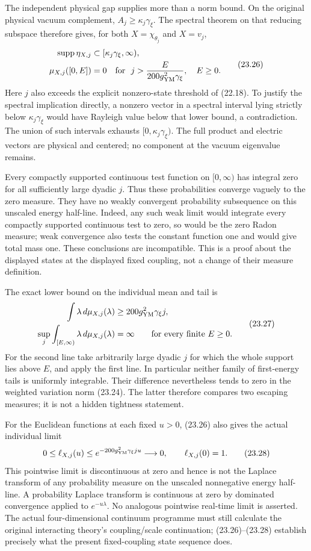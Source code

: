 \documentclass[
]{article}
\begin{document}
The independent physical gap supplies more than a norm bound. On the
original physical vacuum complement, \(A_j\ge\kappa_j\gamma_\xi\). The
spectral theorem on that reducing subspace therefore gives, for both
\(X=\chi_{\theta_j}\) and \(X=v_j\), \[
\begin{aligned}
\operatorname{supp}\eta_{X,j}
 &\subset[\kappa_j\gamma_\xi,\infty),\\
\mu_{X,j}([0,E])&=0
\quad\hbox{for }\ 
j>\frac{E}{200g_{\rm YM}^2\gamma_\xi},\quad E\ge0 .
\end{aligned}\tag{23.26}
\] Here \(j\) also exceeds the explicit nonzero-state threshold of
(22.18). To justify the spectral implication directly, a nonzero vector
in a spectral interval lying strictly below \(\kappa_j\gamma_\xi\) would
have Rayleigh value below that lower bound, a contradiction. The union
of such intervals exhausts \([0,\kappa_j\gamma_\xi)\). The full product
and electric vectors are physical and centered; no component at the
vacuum eigenvalue remains.

Every compactly supported continuous test function on \([0,\infty)\) has
integral zero for all sufficiently large dyadic \(j\). Thus these
probabilities converge vaguely to the zero measure. They have no weakly
convergent probability subsequence on this unscaled energy half-line.
Indeed, any such weak limit would integrate every compactly supported
continuous test to zero, so would be the zero Radon measure; weak
convergence also tests the constant function one and would give total
mass one. These conclusions are incompatible. This is a proof about the
displayed states at the displayed fixed coupling, not a change of their
measure definition.

The exact lower bound on the individual mean and tail is \[
\begin{aligned}
\int\lambda\,d\mu_{X,j}(\lambda)
 &\ge200g_{\rm YM}^2\gamma_\xi j,\\
\sup_j\int_{[E,\infty)}\lambda\,d\mu_{X,j}(\lambda)
 &=\infty \qquad\hbox{for every finite }E\ge0 .
\end{aligned}\tag{23.27}
\] For the second line take arbitrarily large dyadic \(j\) for which the
whole support lies above \(E\), and apply the first line. In particular
neither family of first-energy tails is uniformly integrable. Their
difference nevertheless tends to zero in the weighted variation norm
(23.24). The latter therefore compares two escaping measures; it is not
a hidden tightness statement.

For the Euclidean functions at each fixed \(u>0\), (23.26) also gives
the actual individual limit \[
0\le\ell_{X,j}(u)
 \le e^{-200g_{\rm YM}^2\gamma_\xi ju}\longrightarrow0,
\qquad \ell_{X,j}(0)=1 .
\tag{23.28}
\] This pointwise limit is discontinuous at zero and hence is not the
Laplace transform of any probability measure on the unscaled nonnegative
energy half-line. A probability Laplace transform is continuous at zero
by dominated convergence applied to \(e^{-u\lambda}\). No analogous
pointwise real-time limit is asserted. The actual four-dimensional
continuum programme must still calculate the original interacting
theory's coupling/scale continuation; (23.26)--(23.28) establish
precisely what the present fixed-coupling state sequence does.
\end{document}
